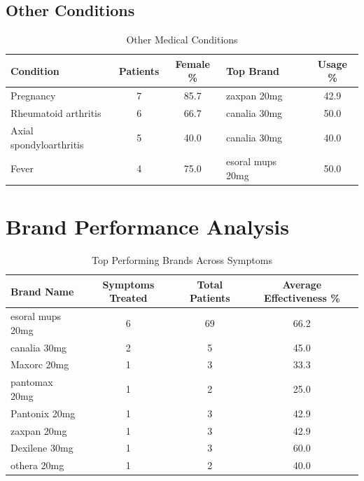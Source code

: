 \documentclass[10pt]{article}
\begin{document}
\subsection{Other Conditions}
\begin{table}[h!]
\centering
\caption{Other Medical Conditions}
\label{tab:other_conditions}
\begin{tabular}{l|c|c|l|c}
\toprule
\rowcolor{headercolor}
\textbf{Condition} & \textbf{Patients} & \textbf{Female \%} & \textbf{Top Brand} & \textbf{Usage \%} \\
\midrule
Pregnancy & 7 & 85.7 & zaxpan 20mg & 42.9 \\
\rowcolor{altrowcolor}
Rheumatoid arthritis & 6 & 66.7 & canalia 30mg & 50.0 \\
Axial spondyloarthritis & 5 & 40.0 & canalia 30mg & 40.0 \\
\rowcolor{altrowcolor}
Fever & 4 & 75.0 & esoral mups 20mg & 50.0 \\
\bottomrule
\end{tabular}
\end{table}

\section{Brand Performance Analysis}

\begin{table}[h!]
\centering
\caption{Top Performing Brands Across Symptoms}
\label{tab:brand_performance}
\begin{tabular}{l|c|c|c}
\toprule
\rowcolor{headercolor}
\textbf{Brand Name} & \textbf{Symptoms Treated} & \textbf{Total Patients} & \textbf{Average Effectiveness \%} \\
\midrule
esoral mups 20mg & 6 & 69 & 66.2 \\
\rowcolor{altrowcolor}
canalia 30mg & 2 & 5 & 45.0 \\
Maxorc 20mg & 1 & 3 & 33.3 \\
\rowcolor{altrowcolor}
pantomax 20mg & 1 & 2 & 25.0 \\
Pantonix 20mg & 1 & 3 & 42.9 \\
\rowcolor{altrowcolor}
zaxpan 20mg & 1 & 3 & 42.9 \\
Dexilene 30mg & 1 & 3 & 60.0 \\
\rowcolor{altrowcolor}
othera 20mg & 1 & 2 & 40.0 \\
\bottomrule
\end{tabular}
\end{table}
\end{document}
